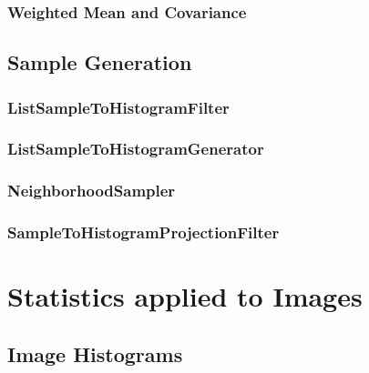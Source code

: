 \ifitkFullVersion 

\fi

\subsubsection{Weighted Mean and Covariance}
\label{sec:WeightedMeanCovariance}

\ifitkFullVersion 

\fi

\subsection{Sample Generation}
\label{sec:SampleGeneration}

\subsubsection{ListSampleToHistogramFilter}
\label{sec:ListSampleToHistogramFilter}

\ifitkFullVersion 

\fi

\subsubsection{ListSampleToHistogramGenerator}
\label{sec:ListSampleToHistogramGenerator}

\ifitkFullVersion 

\fi

\subsubsection{NeighborhoodSampler}
\label{sec:NeighborhoodSampler}

\ifitkFullVersion 

\fi

\subsubsection{SampleToHistogramProjectionFilter}
\label{sec:SampleToHistogramProjectionFilter}

\ifitkFullVersion 

\fi

\section{Statistics applied to Images}
\label{sec:StatisticsAppliedToImages}

\subsection{Image Histograms}
\label{sec:ImageHistogram}


